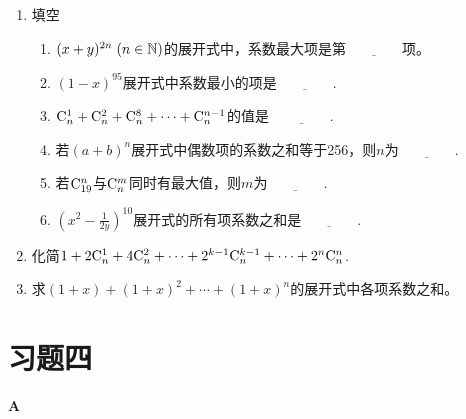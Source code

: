 \begin{ex}
\begin{enumerate}
    \item 填空
\begin{enumerate}[(1)]
 \item $(x+y)^{2n}\; (n\in \N) $的展开式中，系数最大项是第$\underline{\qquad\qquad}$项。
   \item $(1-x)^{95}$展开式中系数最小的项是$\underline{\qquad\qquad}$.
   \item $\comb{n}{1}+\comb{n}{2}+\comb{n}{8}+\cdots +\comb{n}{n-1} $的值是  $\underline{\qquad\qquad}$.
   \item 
若$ (a+b)^{n} $展开式中偶数项的系数之和等于256，则$n$为$\underline{\qquad\qquad}$.
   \item 
若$ \comb{19}{n} $与$ \comb{n}{m} $同时有最大值，则$m$为$\underline{\qquad\qquad}$.
   \item 
$\left(x^{2}-\frac{1}{2y}\right)^{10} $展开式的所有项系数之和是$\underline{\qquad\qquad}$. 
\end{enumerate}
\item 化简$ 1+2\comb{n}{1}+4\comb{n}{2}+\cdots +2^{k-1}\comb{n}{k-1}+\cdots +2^{n}\comb{n}{n}$.

\item 求$ (1+x)+(1+x)^{2}+\cdots +(1+x)^{n} $的展开式中各项系数之和。
\end{enumerate}
\end{ex}




\section*{习题四}
\begin{center}
\bfseries A
\end{center}


